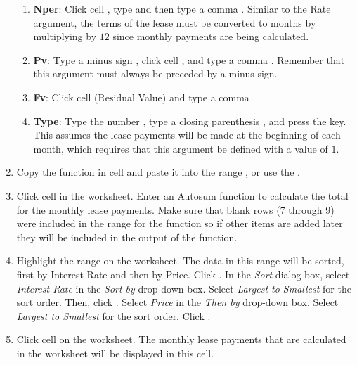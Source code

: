\begin{enumerate}
\begin{enumerate}
		\item \textbf{Nper}: Click cell , type  and then type a comma \fmtTyping{,}. Similar to the Rate argument, the terms of the lease must be converted to months by multiplying by $ 12 $ since monthly payments are being calculated.
		
		\item \textbf{Pv}: Type a minus sign \fmtTyping{-}, click cell , and type a comma \fmtTyping{,}. Remember that this argument must always be preceded by a minus sign.
		
		\item \textbf{Fv}: Click cell  (Residual Value) and type a comma \fmtTyping{,}.
		
		\item \textbf{Type}: Type the number , type a closing parenthesis \fmtTyping{)}, and press the  key. This assumes the lease payments will be made at the beginning of each month, which requires that this argument be defined with a value of $ 1 $.
	\end{enumerate}

	\item Copy the  function in cell  and paste it into the range , or use the .
	
	\item Click cell  in the  worksheet. Enter an Autosum function to calculate the total for the monthly lease payments. Make sure that blank rows (7 through 9) were included in the range for the  function so if other items are added later they will be included in the output of the  function.
	
	\item Highlight the range  on the  worksheet. The data in this range will be sorted, first by Interest Rate and then by Price. Click . In the \textit{Sort} dialog box, select \textit{Interest Rate} in the \textit{Sort by} drop-down box. Select \textit{Largest to Smallest} for the sort order. Then, click . Select \textit{Price} in the \textit{Then by} drop-down box. Select \textit{Largest to Smallest} for the sort order. Click .
	
	\item Click cell  on the  worksheet. The monthly lease payments that are calculated in the  worksheet will be displayed in this cell.
	

\end{enumerate}
